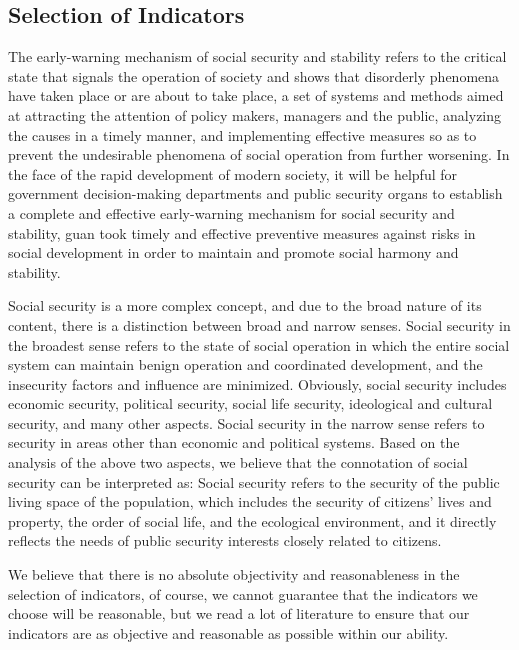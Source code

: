 \documentclass[12pt]{article}  %
\begin{document}
\subsection{Selection of Indicators}
The early-warning mechanism of social security and stability refers to the critical state that signals the operation of society and shows that disorderly phenomena have taken place or are about to take place, a set of systems and methods aimed at attracting the attention of policy makers, managers and the public, analyzing the causes in a timely manner, and implementing effective measures so as to prevent the undesirable phenomena of social operation from further worsening. In the face of the rapid development of modern society, it will be helpful for government decision-making departments and public security organs to establish a complete and effective early-warning mechanism for social security and stability, guan took timely and effective preventive measures against risks in social development in order to maintain and promote social harmony and stability.

Social security is a more complex concept, and due to the broad nature of its content, there is a distinction between broad and narrow senses. Social security in the broadest sense refers to the state of social operation in which the entire social system can maintain benign operation and coordinated development, and the insecurity factors and influence are minimized. Obviously, social security includes economic security, political security, social life security, ideological and cultural security, and many other aspects. Social security in the narrow sense refers to security in areas other than economic and political systems. Based on the analysis of the above two aspects, we believe that the connotation of social security can be interpreted as: Social security refers to the security of the public living space of the population, which includes the security of citizens' lives and property, the order of social life, and the ecological environment, and it directly reflects the needs of public security interests closely related to citizens.

We believe that there is no absolute objectivity and reasonableness in the selection of indicators, of course, we cannot guarantee that the indicators we choose will be reasonable, but we read a lot of literature to ensure that our indicators are as objective and reasonable as possible within our ability.
\end{document}
